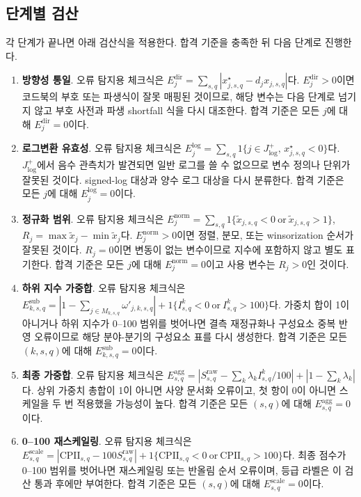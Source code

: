 \documentclass[11pt,a4paper]{report}
\newenvironment{summaryenum}{\begin{enumerate}[label=\arabic*.,leftmargin=1.8em,itemsep=0.45em,topsep=0.35em]\RaggedRight}{\end{enumerate}}
\begin{document}
\subsection{단계별 검산}
각 단계가 끝나면 아래 검산식을 적용한다. 합격 기준을 충족한 뒤 다음 단계로 진행한다.

\begingroup
\footnotesize
\begin{summaryenum}
  \item \textbf{방향성 통일}. 오류 탐지용 체크식은 $E^{\mathrm{dir}}_{j}=\sum_{s,q}\left|x^{\star}_{j,s,q}-d_j x_{j,s,q}\right|$다. $E^{\mathrm{dir}}_{j}>0$이면 코드북의 부호 또는 파생식이 잘못 매핑된 것이므로, 해당 변수는 다음 단계로 넘기지 않고 부호 사전과 파생 shortfall 식을 다시 대조한다. 합격 기준은 모든 $j$에 대해 $E^{\mathrm{dir}}_{j}=0$이다.
  \item \textbf{로그변환 유효성}. 오류 탐지용 체크식은 $E^{\mathrm{log}}_{j}=\sum_{s,q}1\{j \in J_{\log}^{+},\, x^{\star}_{j,s,q}<0\}$다. $J_{\log}^{+}$에서 음수 관측치가 발견되면 일반 로그를 쓸 수 없으므로 변수 정의나 단위가 잘못된 것이다. signed-log 대상과 양수 로그 대상을 다시 분류한다. 합격 기준은 모든 $j$에 대해 $E^{\mathrm{log}}_{j}=0$이다.
  \item \textbf{정규화 범위}. 오류 탐지용 체크식은 $E^{\mathrm{norm}}_{j}=\sum_{s,q}1\{\widetilde{x}_{j,s,q}<0 \ \text{or} \ \widetilde{x}_{j,s,q}>1\}$, \quad $R_j=\max\widetilde{x}_{j}-\min\widetilde{x}_{j}$다. $E^{\mathrm{norm}}_{j}>0$이면 정렬, 분모, 또는 winsorization 순서가 잘못된 것이다. $R_j=0$이면 변동이 없는 변수이므로 지수에 포함하지 않고 별도 표기한다. 합격 기준은 모든 $j$에 대해 $E^{\mathrm{norm}}_{j}=0$이고 사용 변수는 $R_j>0$인 것이다.
  \item \textbf{하위 지수 가중합}. 오류 탐지용 체크식은 $E^{\mathrm{sub}}_{k,s,q}=\left|1-\sum_{j \in M_{k,s,q}}\omega'_{j,k,s,q}\right| + 1\{I^{k}_{s,q}<0 \ \text{or} \ I^{k}_{s,q}>100\}$다. 가중치 합이 1이 아니거나 하위 지수가 0--100 범위를 벗어나면 결측 재정규화나 구성요소 중복 반영 오류이므로 해당 분야-분기의 구성요소 표를 다시 생성한다. 합격 기준은 모든 $(k,s,q)$에 대해 $E^{\mathrm{sub}}_{k,s,q}=0$이다.
  \item \textbf{최종 가중합}. 오류 탐지용 체크식은 $E^{\mathrm{agg}}_{s,q}=\left|S^{\mathrm{raw}}_{s,q}-\sum_{k}\lambda_k I^{k}_{s,q}/100\right| + \left|1-\sum_k \lambda_k\right|$다. 상위 가중치 총합이 1이 아니면 사양 문서화 오류이고, 첫 항이 0이 아니면 스케일을 두 번 적용했을 가능성이 높다. 합격 기준은 모든 $(s,q)$에 대해 $E^{\mathrm{agg}}_{s,q}=0$이다.
  \item \textbf{0--100 재스케일링}. 오류 탐지용 체크식은 $E^{\mathrm{scale}}_{s,q}=\left|\mathrm{CPII}_{s,q}-100S^{\mathrm{raw}}_{s,q}\right| + 1\{\mathrm{CPII}_{s,q}<0 \ \text{or} \ \mathrm{CPII}_{s,q}>100\}$다. 최종 점수가 0--100 범위를 벗어나면 재스케일링 또는 반올림 순서 오류이며, 등급 라벨은 이 검산 통과 후에만 부여한다. 합격 기준은 모든 $(s,q)$에 대해 $E^{\mathrm{scale}}_{s,q}=0$이다.

\end{summaryenum}
\end{document}
